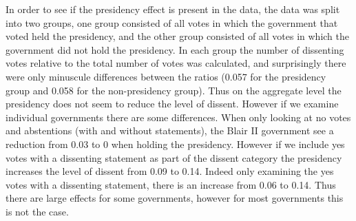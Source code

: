 \begin{table*}[ht]
\begin{center}
\end{center}
\caption{The Ten Most Dissenting Governments Between 1999 and 2009}
\label{tab:dissent}
\end{table*}

In order to see if the presidency effect is present in the data, the data was split into two groups, one group consisted of all votes in which the government that voted held the presidency, and the other group consisted of all votes in which the government did not hold the presidency. In each group the number of dissenting votes relative to the total number of votes was calculated, and surprisingly there were only minuscule differences between the ratios (0.057 for the presidency group and 0.058 for the non-presidency group). Thus on the aggregate level the presidency does not seem to reduce the level of dissent. However if we examine individual governments there are some differences. When only looking at no votes and abstentions (with and without statements), the Blair II government see a reduction from 0.03 to 0 when holding the presidency. However if we include yes votes with a dissenting statement as part of the dissent category the presidency increases the level of dissent from 0.09 to 0.14. Indeed only examining the yes votes with a dissenting statement, there is an increase from 0.06 to 0.14. Thus there are large effects for some governments, however for most governments this is not the case.


